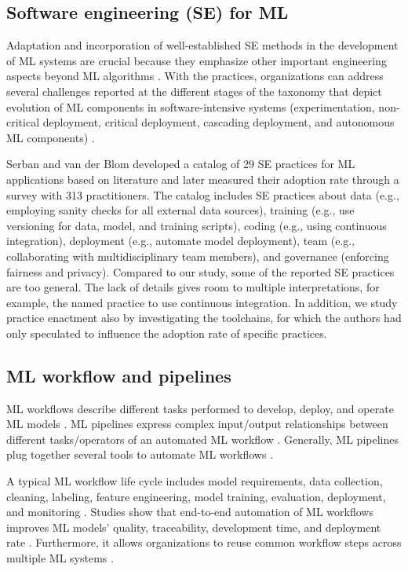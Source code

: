 
\subsection{Software engineering (SE) for ML}
Adaptation and incorporation of well-established SE methods in the development of ML systems are crucial \cite{Amershi2019}because they emphasize other important engineering aspects beyond ML algorithms \cite{Sculley2015}. With the practices, organizations can address several challenges reported at the different stages of the taxonomy that depict evolution of ML components in software-intensive systems (experimentation, non-critical deployment, critical deployment, cascading deployment, and autonomous ML components) \cite{Lwakatare2019}.

Serban and van der Blom \cite{Serban2020Practices} developed a catalog of 29 SE practices for ML applications based on literature and later measured their adoption rate through a survey with 313 practitioners. The catalog includes SE practices about data (e.g., employing sanity checks for all external data sources), training (e.g., use versioning for data, model, and training scripts), coding (e.g., using continuous integration), deployment (e.g., automate model deployment), team (e.g., collaborating with multidisciplinary team members), and governance (enforcing fairness and privacy). Compared to our study, some of the reported SE practices are too general. The lack of details gives room to multiple interpretations, for example, the named practice to use continuous integration. In addition, we study practice enactment also by investigating the toolchains, for which the authors \cite{Serban2020Practices} had only speculated to influence the adoption rate of specific practices. 

\subsection{ML workflow and pipelines}

ML workflows describe different tasks performed to develop, deploy, and operate ML models  \cite{Amershi2019}. ML pipelines express complex input/output relationships between different tasks/operators of an automated ML workflow \cite{Doris2021MLPipelines}. Generally, ML pipelines plug together several tools to automate ML workflows \cite{Hummer2019IBM}.

A typical ML workflow life cycle includes model requirements, data collection, cleaning, labeling, feature engineering, model training, evaluation, deployment, and monitoring  \cite{Amershi2019}. Studies show that end-to-end automation of ML workflows improves ML models’ quality, traceability, development time, and deployment rate  \cite{Doris2021MLPipelines, Hummer2019IBM}. Furthermore, it allows organizations to reuse common workflow steps across multiple ML systems \cite{Baylor2017, Hummer2019IBM}.

